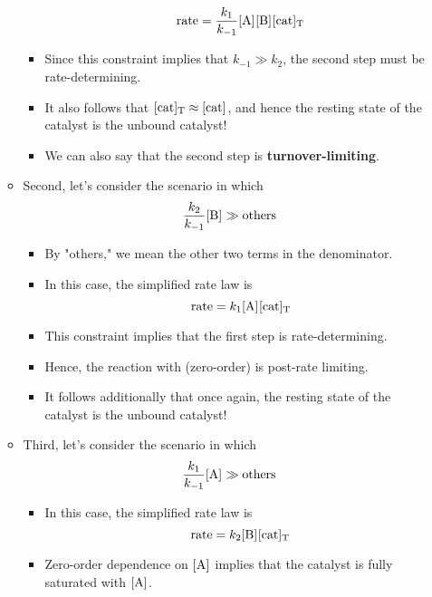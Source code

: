 \documentclass[../notes.tex]{subfiles}
\begin{document}
\begin{itemize}
\begin{itemize}
\begin{itemize}
\begin{equation*}
                \rate = \frac{k_1}{k_{-1}}\cnc{A}\cnc{B}\cnc[T]{cat}
            \end{equation*}
            \item Since this constraint implies that $k_{-1}\gg k_2$, the second step must be rate-determining.
            \item It also follows that $\cnc[T]{cat}\approx\cnc{cat}$, and hence the resting state of the catalyst is the unbound catalyst!
            \item We can also say that the second step is \textbf{turnover-limiting}.
        \end{itemize}
        \item Second, let's consider the scenario in which
        \begin{equation*}
            \frac{k_2}{k_{-1}}\cnc{B} \gg \text{others}
        \end{equation*}
        \begin{itemize}
            \item By "others," we mean the other two terms in the denominator.
            \item In this case, the simplified rate law is
            \begin{equation*}
                \rate = k_1\cnc{A}\cnc[T]{cat}
            \end{equation*}
            \item This constraint implies that the first step is rate-determining.
            \item Hence, the reaction with  (zero-order) is post-rate limiting.
            \item It follows additionally that once again, the resting state of the catalyst is the unbound catalyst!
        \end{itemize}
        \item Third, let's consider the scenario in which
        \begin{equation*}
            \frac{k_1}{k_{-1}}\cnc{A} \gg \text{others}
        \end{equation*}
        \begin{itemize}
            \item In this case, the simplified rate law is
            \begin{equation*}
                \rate = k_2\cnc{B}\cnc[T]{cat}
            \end{equation*}
            \item Zero-order dependence on $\cnc{A}$ implies that the catalyst is fully saturated with $\cnc{A}$.

\end{itemize}
\end{itemize}
\end{itemize}
\end{document}
